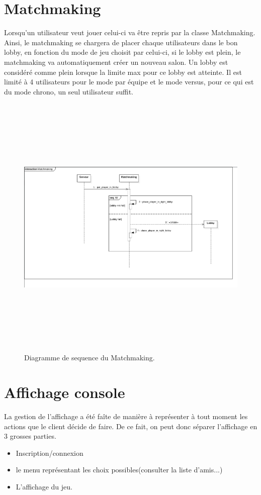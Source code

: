 \documentclass[12pt,a4paper]{article}
\begin{document}
\section{Matchmaking}
Lorsqu'un utilisateur  veut jouer celui-ci va être repris par la classe Matchmaking. Ainsi, le matchmaking se chargera de placer chaque utilisateurs  dans le bon lobby, en fonction du mode de jeu choisit par celui-ci, si le lobby est plein, le matchmaking va automatiquement créer un nouveau salon. Un lobby est considéré comme plein lorsque la limite max pour ce lobby est atteinte. Il est limité à 4 utilisateurs pour le mode par équipe et le mode versus, pour ce qui est du mode chrono, un seul utilisateur suffit. 
 \begin{figure}[H]
  \includegraphics[height=13cm,width=19cm]{MatchSequence.png} 
    \caption{Diagramme de sequence du Matchmaking.}
   \label{fig:picture}
 \end{figure}
\newpage
\section{Affichage console}
La gestion de l'affichage a été faîte de manière à représenter à tout moment les actions que le client décide de faire. De ce fait, on peut donc séparer l'affichage en 3 grosses parties.
\begin{itemize}
\item[]Inscription/connexion
\item[]le menu représentant les choix possibles(consulter la liste d'amis...)
\item[]L'affichage du jeu.
\end{itemize}
\end{document}

